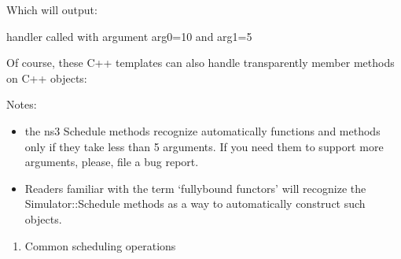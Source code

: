 \documentclass[letterpaper,10pt,english]{sphinxmanual}
\begin{document}
\begin{sphinxVerbatim}[commandchars=\\\{\}]
     
        

   
\end{sphinxVerbatim}

Which will output:

\begin{sphinxVerbatim}[commandchars=\\\{\}]
handler called with argument arg0=10 and arg1=5
\end{sphinxVerbatim}

Of course, these C++ templates can also handle transparently member
methods on C++ objects:


Notes:
\begin{itemize}
\item {} 
the ns\sphinxhyphen{}3 Schedule methods recognize automatically functions and
methods only if they take less than 5 arguments. If you need them to
support more arguments, please, file a bug report.

\item {} 
Readers familiar with the term ‘fully\sphinxhyphen{}bound functors’ will recognize
the Simulator::Schedule methods as a way to automatically construct such
objects.

\end{itemize}
\begin{enumerate}
%
\setcounter{enumi}{1}
\item {} 
Common scheduling operations

\end{enumerate}
\end{document}
